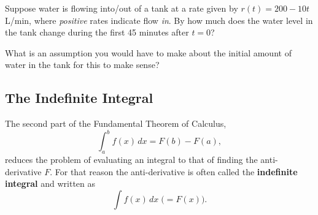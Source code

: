 
\newpage

\begin{problem}
  Suppose water is flowing into/out of a tank at a rate given by $r(t)
  = 200 -10t$ L/min, where {\em positive} rates indicate flow {\em
    in}.  By how much does the water level in the tank change during
  the first 45 minutes after $t=0$?   
\end{problem}

\newpage

 What is an assumption you would have to make about the
  initial amount of water in the tank for this to make sense?



\newpage

\subsection*{The Indefinite Integral}
The second part of the Fundamental Theorem of Calculus,
$$\int_a^b f(x)\,dx = F(b)-F(a),$$ reduces the problem of evaluating
an integral to that of finding the anti-derivative $F$.  For that
reason the anti-derivative is often called the {\bf indefinite
  integral} and written as $$\int f(x)\,dx\;\biggl(=F(x)\biggr).$$

